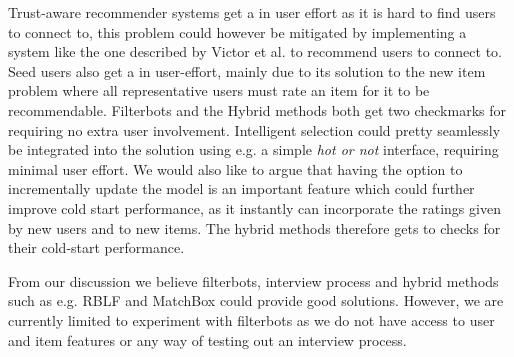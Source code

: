 Trust-aware recommender systems get a  in user effort as it is hard to find users to connect to,
this problem could however be mitigated by implementing a system like the one described by Victor et al. \cite{Victor2008}
to recommend users to connect to. Seed users also get a  in user-effort, mainly due to its solution to the new item
problem where all representative users must rate an item for it to be recommendable. Filterbots and the Hybrid methods both
get two checkmarks for requiring no extra user involvement. Intelligent selection could pretty seamlessly be integrated into
the solution using e.g. a simple \emph{hot or not} interface, requiring minimal user effort. We would also like to argue that having the
option to incrementally update the model is an important feature which could further improve cold start performance, as it instantly can
incorporate the ratings given by new users and to new items. The hybrid methods therefore gets to checks for their cold-start performance.

From our discussion we believe filterbots, interview process and hybrid methods such as e.g. RBLF and MatchBox could provide good solutions.
However, we are currently limited to experiment with filterbots as we do not have access to user and item features or any way
of testing out an interview process.
